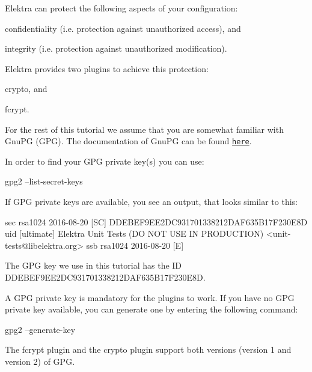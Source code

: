 Elektra can protect the following aspects of your configuration\+:


\begin{DoxyEnumerate}
\item confidentiality (i.\+e. protection against unauthorized access), and
\item integrity (i.\+e. protection against unauthorized modification).
\end{DoxyEnumerate}

Elektra provides two plugins to achieve this protection\+:


\begin{DoxyEnumerate}
\item {\ttfamily crypto}, and
\item {\ttfamily fcrypt}.
\end{DoxyEnumerate}

For the rest of this tutorial we assume that you are somewhat familiar with Gnu\+PG (G\+PG). The documentation of Gnu\+PG can be found \href{https://gnupg.org/documentation/index.html}{\tt here}.

In order to find your G\+PG private key(s) you can use\+:


\begin{DoxyCode}
gpg2 --list-secret-keys
\end{DoxyCode}


If G\+PG private keys are available, you see an output, that looks similar to this\+:


\begin{DoxyCode}
sec   rsa1024 2016-08-20 [SC]
          DDEBEF9EE2DC931701338212DAF635B17F230E8D
uid           [ultimate] Elektra Unit Tests (DO NOT USE IN PRODUCTION) <unit-tests@libelektra.org>
ssb   rsa1024 2016-08-20 [E]
\end{DoxyCode}


The G\+PG key we use in this tutorial has the ID {\ttfamily D\+D\+E\+B\+E\+F9\+E\+E2\+D\+C931701338212\+D\+A\+F635\+B17\+F230\+E8D}.

A G\+PG private key is mandatory for the plugins to work. If you have no G\+PG private key available, you can generate one by entering the following command\+:


\begin{DoxyCode}
gpg2 --generate-key
\end{DoxyCode}


The {\ttfamily fcrypt} plugin and the {\ttfamily crypto} plugin support both versions (version 1 and version 2) of G\+PG.

